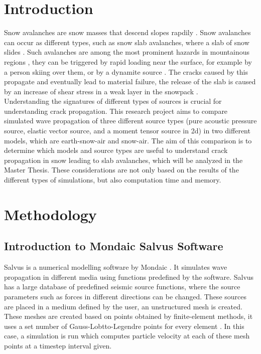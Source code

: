 \documentclass[a4paper,10pt]{article}
\begin{document}
\section{Introduction}
\noindent Snow avalanches are snow masses that descend slopes rapdily \parencite{schweizerSnowAvalancheFormation2003}. Snow avalanches can occur as different types, such as snow slab avalanches, where a slab of snow slides \parencite{gaumeSnowFractureRelation2017}. Such avalanches are among the most prominent hazards in mountainous regions \parencite{gaumeSnowFractureRelation2017}, they can be triggered by rapid loading near the surface, for example by a person skiing over them, or by a dynamite source \parencite{schweizerSnowAvalancheFormation2003}. The cracks caused by this propagate and eventually lead to material failure, the release of the slab is caused by an increase of shear stress in a weak layer in the snowpack \parencite{habermannInfluenceSnowpackLayering2008}. \\

\noindent Understanding the signatures of different types of sources is crucial for understanding crack propagation. This research project aims to compare simulated wave propagation of three different source types (pure acoustic pressure source, elastic vector source, and a moment tensor source in 2d) in two different models, which are earth-snow-air and snow-air. The aim of this comparison is to determine which models and source types are useful to understand crack propagation in snow leading to slab avalanches, which will be analyzed in the Master Thesis. These considerations are not only based on the results of the different types of simulations, but also computation time and memory. 

\section{Methodology}
\subsection{Introduction to Mondaic Salvus Software}
\noindent Salvus is a numerical modelling software by Mondaic \parencite{GetSalvus}. It simulates wave propagation in different media using functions predefined by the software. Salvus has a large database of predefined seismic source functions, where the source parameters such as forces in different directions can be changed. These sources are placed in a medium defined by the user, an unstructured mesh is created. These meshes are created based on points obtained by finite-element methods, it uses a set number of Gauss-Lobtto-Legendre points for every element \parencite{GetSalvus}. In this case, a simulation is run which computes particle velocity at each of these mesh points at a timestep interval given. 
\end{document}
